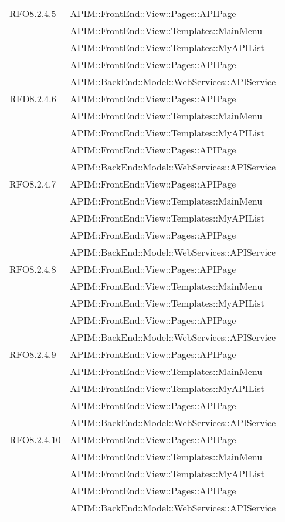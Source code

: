 \begin{longtable}{ p{4cm} | p{12cm} }
\hline RFO8.2.4.5
& APIM::FrontEnd::View::Pages::APIPage \\
& APIM::FrontEnd::View::Templates::MainMenu \\
& APIM::FrontEnd::View::Templates::MyAPIList \\
& APIM::FrontEnd::View::Pages::APIPage \\
& APIM::BackEnd::Model::WebServices::APIService \\

\hline RFD8.2.4.6
& APIM::FrontEnd::View::Pages::APIPage \\
& APIM::FrontEnd::View::Templates::MainMenu \\
& APIM::FrontEnd::View::Templates::MyAPIList \\
& APIM::FrontEnd::View::Pages::APIPage \\
& APIM::BackEnd::Model::WebServices::APIService \\

\hline RFO8.2.4.7
& APIM::FrontEnd::View::Pages::APIPage \\
& APIM::FrontEnd::View::Templates::MainMenu \\
& APIM::FrontEnd::View::Templates::MyAPIList \\
& APIM::FrontEnd::View::Pages::APIPage \\
& APIM::BackEnd::Model::WebServices::APIService \\

\hline RFO8.2.4.8
& APIM::FrontEnd::View::Pages::APIPage \\
& APIM::FrontEnd::View::Templates::MainMenu \\
& APIM::FrontEnd::View::Templates::MyAPIList \\
& APIM::FrontEnd::View::Pages::APIPage \\
& APIM::BackEnd::Model::WebServices::APIService \\

\hline RFO8.2.4.9
& APIM::FrontEnd::View::Pages::APIPage \\
& APIM::FrontEnd::View::Templates::MainMenu \\
& APIM::FrontEnd::View::Templates::MyAPIList \\
& APIM::FrontEnd::View::Pages::APIPage \\
& APIM::BackEnd::Model::WebServices::APIService \\

\hline RFO8.2.4.10
& APIM::FrontEnd::View::Pages::APIPage \\
& APIM::FrontEnd::View::Templates::MainMenu \\
& APIM::FrontEnd::View::Templates::MyAPIList \\
& APIM::FrontEnd::View::Pages::APIPage \\
& APIM::BackEnd::Model::WebServices::APIService \\


\end{longtable}

